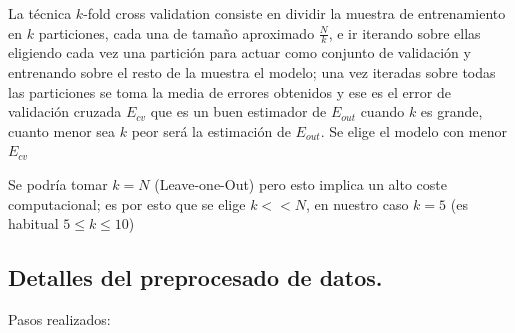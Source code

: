 \documentclass[11pt,a4paper]{article}
\theoremstyle{definition}
\begin{document}
	 La técnica $k$-fold cross validation consiste en dividir la muestra de entrenamiento en $k$ particiones, cada una de tamaño aproximado $\frac{N}{k}$, e ir iterando sobre ellas eligiendo cada vez una partición para actuar como conjunto de validación y entrenando sobre el resto de la muestra el modelo; una vez iteradas sobre todas las particiones se toma la media de errores obtenidos y ese es el error de validación cruzada $E_{cv}\iffalse=\frac{1}{N}\sum_{i=1}^N E_{val}(g_i^-)\fi$ que es un buen estimador de $E_{out}$ cuando $k$ es grande, cuanto menor sea $k$ peor será la estimación de $E_{out}$. Se elige el modelo con menor $E_{cv}$
	 
	  Se podría tomar $k=N$ (Leave-one-Out) pero esto implica un alto coste computacional; es por esto que se elige $k<< N$, en nuestro caso $k=5$ (es habitual $5\leq k\leq 10$)
	\subsection{Detalles del preprocesado de datos.}
	Pasos realizados:
\end{document}
